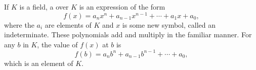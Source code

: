 If $K$ is a field, a  over $K$ is an expression of the form $$f(x) = a_n x^n + a_{n-1} x^{n-1} + \cdots + a_1 x + a_0,$$ where the $a_i$ are elements of $K$ and $x$ is some new symbol, called an indeterminate. These polynomials add and multiply in the familiar manner. For any $b$ in $K$, the value of $f(x)$ at $b$ is $$f(b) = a_n b^n + a_{n-1} b^{n-1} + \cdots + a_0,$$ which is an element of $K$.
